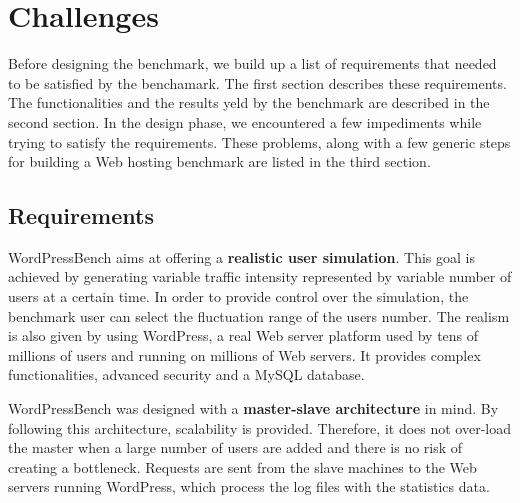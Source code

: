 \chapter{Challenges}
\label{chapter:chapter3}

Before designing the benchmark, we build up a list of requirements that needed to be satisfied by the benchamark. The first section describes these requirements. The functionalities and the results yeld by the benchmark are described in the second section. In the design phase, we encountered a few impediments while trying to satisfy the requirements. These problems, along with a few generic steps for building a Web hosting benchmark are listed in the third section.


\section{Requirements}
\label{sec:projectdescription}

WordPressBench aims at offering a \textbf{realistic user simulation}. This goal is achieved by generating variable traffic intensity represented by variable number of users at a certain time. In order to provide control over the simulation, the benchmark user can select the fluctuation range of the users number. The realism is also given by using WordPress, a real Web server platform used by tens of millions of users and running on millions of Web servers. It provides complex functionalities, advanced security and a MySQL database.

WordPressBench was designed with a \textbf{master-slave architecture} in mind. By following this architecture, scalability is provided. Therefore, 
it does not over-load the master when a large number of users are added and there is no risk of creating a bottleneck. Requests are sent from the slave machines to the Web servers running WordPress, which process the log files with the statistics data.

